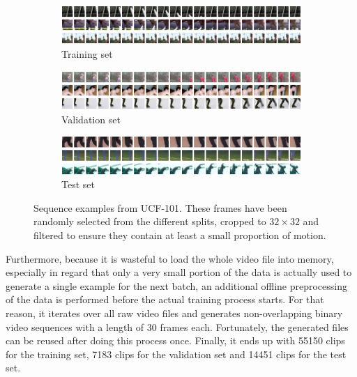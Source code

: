 \begin{figure}[htb]
\centering
\begin{subfigure}{1.0\textwidth}
  \centering
  \includegraphics[width=1.0\linewidth]{figures/ds/ucf_train.png}
  \caption{Training set}
  \label{fig:ucf_train}
  \vspace{.1cm}
\end{subfigure}
\begin{subfigure}{1.0\textwidth}
  \centering
  \includegraphics[width=1.0\linewidth]{figures/ds/ucf_valid.png}
  \caption{Validation set}
  \label{fig:ucf_valid}
  \vspace{.1cm}
\end{subfigure}
\begin{subfigure}{1.0\textwidth}
  \centering
  \includegraphics[width=1.0\linewidth]{figures/ds/ucf_test.png}
  \caption{Test set}
  \label{fig:ucf_test}
\end{subfigure}
\caption[UCF-101 Crop Image Samples]{Sequence examples from UCF-101. These frames have been randomly selected from the different splits, cropped to $32 \times 32 $ and filtered to ensure they contain at least a small proportion of motion.}
\label{fig:ucf}
\end{figure}

Furthermore, because it is wasteful to load the whole video file into memory, especially in regard that only a very small portion of the data is actually used to generate a single example for the next batch, an additional offline preprocessing of the data is performed before the actual training process starts. For that reason, it iterates over all raw video files and generates non-overlapping binary video sequences with a length of \num{30} frames each. Fortunately, the generated files can be reused after doing this process once. Finally, it ends up with \num{55150} clips for the training set, \num{7183} clips for the validation set and \num{14451} clips for the test set.


